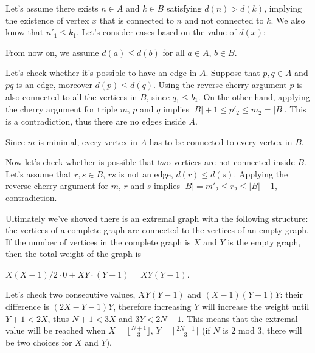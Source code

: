 \documentclass{article}
\begin{document}
Let's assume there exists \(\displaystyle n\in A\) and \(\displaystyle k\in B\) satisfying \(\displaystyle d(n)>d(k)\), implying the existence of vertex \(\displaystyle x\) that is connected to \(\displaystyle n\) and not connected to \(\displaystyle k\). We also know that \(\displaystyle n'_1\le k_1\). Let's consider cases based on the value of \(\displaystyle d(x)\):

From now on, we assume \(\displaystyle d(a)\le d(b)\) for all \(\displaystyle a\in A\), \(\displaystyle b\in B\).

Let's check whether it's possible to have an edge in \(\displaystyle A\). Suppose that \(\displaystyle p,q\in A\) and \(\displaystyle pq\) is an edge, moreover \(\displaystyle d(p)\le d(q)\). Using the reverse cherry argument \(\displaystyle p\) is also connected to all the vertices in \(\displaystyle B\), since \(\displaystyle q_1\le b_1\). On the other hand, applying the cherry argument for triple \(\displaystyle m\), \(\displaystyle p\) and \(\displaystyle q\) implies \(\displaystyle |B|+1\le p'_2\le m_2=|B|\). This is a contradiction, thus there are no edges inside \(\displaystyle A\).

Since \(\displaystyle m\) is minimal, every vertex in \(\displaystyle A\) has to be connected to every vertex in \(\displaystyle B\).

Now let's check whether is possible that two vertices are not connected inside \(\displaystyle B\). Let's assume that \(\displaystyle r,s\in B\), \(\displaystyle rs\) is not an edge, \(\displaystyle d(r)\le d(s)\). Applying the reverse cherry argument for \(\displaystyle m\), \(\displaystyle r\) and \(\displaystyle s\) implies \(\displaystyle |B|=m'_2\le r_2\le |B|-1\), contradiction.

Ultimately we've showed there is an extremal graph with the following structure: the vertices of a complete graph are connected to the vertices of an empty graph. If the number of vertices in the complete graph is \(\displaystyle X\) and \(\displaystyle Y\) is the empty graph, then the total weight of the graph is

\(\displaystyle X(X-1)/2 \cdot 0 + XY \cdot (Y-1) = XY(Y-1).\)

Let's check two consecutive values, \(\displaystyle XY(Y-1)\) and \(\displaystyle (X-1)(Y+1)Y\): their difference is \(\displaystyle (2X-Y-1)Y\), therefore increasing \(\displaystyle Y\) will increase the weight until \(\displaystyle Y+1<2X\), thus \(\displaystyle N+1<3X\) and \(\displaystyle 3Y<2N-1\). This means that the extremal value will be reached when \(\displaystyle X=\lfloor \frac{N+1}{3} \rfloor\), \(\displaystyle Y=\lceil \frac{2N-1}{3} \rceil\) (if \(\displaystyle N\) is 2 mod 3, there will be two choices for \(\displaystyle X\) and \(\displaystyle Y\)).
\end{document}
